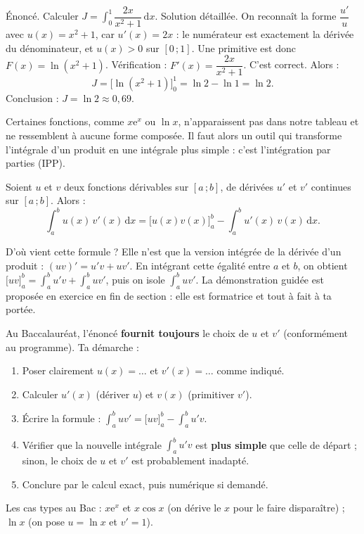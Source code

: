 \documentclass[11pt]{article}
\newcommand{\cle}[1]{{\popxbold\color{popdark}#1}}
\newcounter{popsec}
\newcounter{popsub}
\newcommand{\courssub}[1]{%
  \stepcounter{popsub}%
  \par\vspace{9pt}\noindent{\popxbold\fontsize{11.5}{13}\selectfont\color{popink}{\color{poporange}\thepopsec.\thepopsub}\hspace{6pt}#1}\par\nopagebreak\vspace{4pt}
}
\begin{document}
\begin{exoresolu}
Énoncé. Calculer $J = \displaystyle\int_0^1 \dfrac{2x}{x^2+1}\,\mathrm{d}x$.
\tcblower
Solution détaillée. On reconnaît la forme $\dfrac{u'}{u}$ avec $u(x) = x^2 + 1$, car $u'(x) = 2x$ : le numérateur est exactement la dérivée du dénominateur, et $u(x) > 0$ sur $[0\,;1]$. Une primitive est donc $F(x) = \ln(x^2+1)$. Vérification : $F'(x) = \dfrac{2x}{x^2+1}$. C'est correct. Alors :
\[ J = \big[\ln(x^2+1)\big]_0^1 = \ln 2 - \ln 1 = \ln 2. \]
Conclusion : $J = \ln 2 \approx 0{,}69$.
\end{exoresolu}

\courssub{Intégration par parties}

Certaines fonctions, comme $x\mathrm{e}^x$ ou $\ln x$, n'apparaissent pas dans notre tableau et ne ressemblent à aucune forme composée. Il faut alors un outil qui transforme l'intégrale d'un produit en une intégrale plus simple : c'est l'\cle{intégration par parties} (IPP).

\begin{propriete}
Soient $u$ et $v$ deux fonctions dérivables sur $[a\,;b]$, de dérivées $u'$ et $v'$ continues sur $[a\,;b]$. Alors :
\[ \int_a^b u(x)\,v'(x)\,\mathrm{d}x = \big[u(x)v(x)\big]_a^b - \int_a^b u'(x)\,v(x)\,\mathrm{d}x. \]
\end{propriete}

D'où vient cette formule ? Elle n'est que la version intégrée de la dérivée d'un produit : $(uv)' = u'v + uv'$. En intégrant cette égalité entre $a$ et $b$, on obtient $\big[uv\big]_a^b = \displaystyle\int_a^b u'v + \int_a^b uv'$, puis on isole $\displaystyle\int_a^b uv'$. La démonstration guidée est proposée en exercice en fin de section : elle est formatrice et tout à fait à ta portée.

\begin{methode}
Au Baccalauréat, l'énoncé \textbf{fournit toujours} le choix de $u$ et $v'$ (conformément au programme). Ta démarche :
\begin{enumerate}
\item Poser clairement $u(x) = \ldots$ et $v'(x) = \ldots$ comme indiqué.
\item Calculer $u'(x)$ (dériver $u$) et $v(x)$ (primitiver $v'$).
\item Écrire la formule : $\displaystyle\int_a^b uv' = \big[uv\big]_a^b - \int_a^b u'v$.
\item Vérifier que la nouvelle intégrale $\displaystyle\int_a^b u'v$ est \textbf{plus simple} que celle de départ ; sinon, le choix de $u$ et $v'$ est probablement inadapté.
\item Conclure par le calcul exact, puis numérique si demandé.
\end{enumerate}
Les cas types au Bac : $x\mathrm{e}^x$ et $x\cos x$ (on dérive le $x$ pour le faire disparaître) ; $\ln x$ (on pose $u = \ln x$ et $v' = 1$).
\end{methode}
\end{document}
